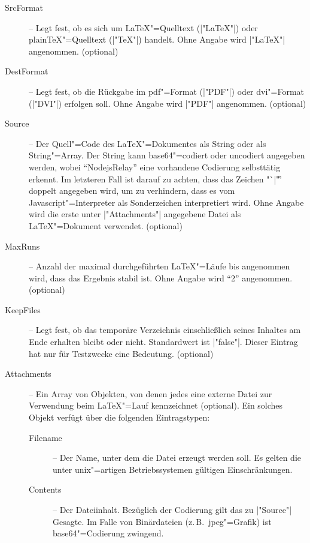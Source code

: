 \documentclass[%
fontsize=11pt
,paper=a4
,twoside
,headings=normal
,pagesize
]{scrartcl}
\begin{document}
\begin{description}

  \item[SrcFormat] -- Legt fest, ob es sich um \LaTeX"=Quelltext
  (|"LaTeX"|) oder plain\TeX"=Quelltext (|"TeX"|) handelt. Ohne
  Angabe wird |"LaTeX"| angenommen. (optional)

  \item[DestFormat] -- Legt fest, ob die Rückgabe im pdf"=Format
  (|"PDF"|) oder dvi"=Format (|"DVI"|) erfolgen soll. Ohne
  Angabe wird |"PDF"| angenommen. (optional)

  \item[Source] -- Der Quell"=Code des \LaTeX"=Dokumentes als String
  oder als String"=Array. Der String kann base64"=codiert oder
  uncodiert angegeben werden, wobei "`NodejsRelay"' eine vorhandene
  Codierung selbsttätig erkennt. Im letzteren Fall ist darauf zu
  achten, dass das Zeichen "`|\|"' doppelt angegeben wird, um zu
  verhindern, dass es vom Javascript"=Interpreter als Sonderzeichen
  interpretiert wird. Ohne Angabe wird die erste unter
  |"Attachments"| angegebene Datei als \LaTeX"=Dokument verwendet.
  (optional)

  \item[MaxRuns] -- Anzahl der maximal durchgeführten \LaTeX"=Läufe
  bis angenommen wird, dass das Ergebnis stabil ist. Ohne Angabe
  wird "`2"' angenommen. (optional)

  \item[KeepFiles] -- Legt fest, ob das temporäre Verzeichnis
  einschließlich seines Inhaltes am Ende erhalten bleibt oder nicht.
  Standardwert ist |"false"|. Dieser Eintrag hat nur für Testzwecke
  eine Bedeutung. (optional)

  \item[Attachments] -- Ein Array von Objekten, von denen jedes eine
  externe Datei zur Verwendung beim \LaTeX"=Lauf kennzeichnet
  (optional). Ein solches Objekt verfügt über die folgenden
  Eintragstypen:

  \begin{description}

    \item[Filename] -- Der Name, unter dem die Datei erzeugt werden
    soll. Es gelten die unter unix"=artigen Betriebssystemen gültigen
    Einschränkungen.

    \item[Contents] -- Der Dateiinhalt. Bezüglich der
    Codierung gilt das zu |"Source"| Gesagte. Im Falle von
    Binärdateien (z.\,B.\ jpeg"=Grafik) ist base64"=Codierung zwingend.
    
  \end{description}

\end{description}
\end{document}
